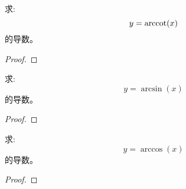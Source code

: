\begin{proposition}
    求:
    \[ y = \mathrm{arccot}(x) \]
    的导数。
\end{proposition}    
\begin{proof}
    
\end{proof}

\begin{proposition}
    求:
    \[ y = \arcsin(x) \]
    的导数。
\end{proposition}    
\begin{proof}
    
\end{proof}

\begin{proposition}
    求:
    \[ y = \arccos(x) \]
    的导数。
\end{proposition}    
\begin{proof}
    
\end{proof}